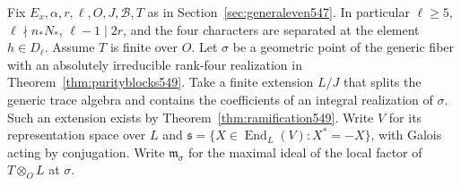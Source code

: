 \documentclass[a4paper,11pt]{article}
\theoremstyle{definition}
\theoremstyle{remark}
\numberwithin{equation}{section}
\begin{document}
Fix \(E_x,\alpha,r,\ell,O,J,\mathcal B,T\) as in
Section~\ref{sec:generaleven547}. In particular \(\ell\ge5\),
\(\ell\nmid n_*N_*\), \(\ell-1\mid 2r\), and the four characters
are separated at the element \(h\in D_\ell\). Assume \(T\) is
finite over \(O\). Let \(\sigma\) be a geometric point of the
generic fiber with an absolutely irreducible rank-four realization
in Theorem~\ref{thm:purityblocks549}. Take a finite extension
\(L/J\) that splits the generic trace algebra and contains the
coefficients of an integral realization of \(\sigma\). Such an
extension exists by Theorem~\ref{thm:ramification549}. Write \(V\)
for its representation space over \(L\) and
\(\mathfrak s=\{X\in\operatorname{End}_L(V):X^*=-X\}\), with
Galois acting by conjugation. Write \(\mathfrak m_\sigma\) for the
maximal ideal of the local factor of \(T\otimes_O L\) at \(\sigma\).
\end{document}
